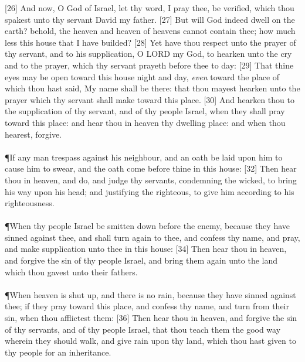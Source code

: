 [26] \textcolor[cmyk]{0.99998,1,0,0}{And now, O God of Israel, let thy word, I pray thee, be verified, which thou spakest unto thy servant David my father.}
[27] \textcolor[cmyk]{0.99998,1,0,0}{But will God indeed dwell on the earth? behold, the heaven and heaven of heavens cannot contain thee; how much less this house that I have builded?}
[28] \textcolor[cmyk]{0.99998,1,0,0}{Yet have thou respect unto the prayer of thy servant, and to his supplication, O LORD my God, to hearken unto the cry and to the prayer, which thy servant prayeth before thee to day:}
[29] \textcolor[cmyk]{0.99998,1,0,0}{That thine eyes may be open toward this house night and day, \emph{even} toward the place of which thou hast said, My name shall be there: that thou mayest hearken unto the prayer which thy servant shall make toward this place.}
[30] \textcolor[cmyk]{0.99998,1,0,0}{And hearken thou to the supplication of thy servant, and of thy people Israel, when they shall pray toward this place: and hear thou in heaven thy dwelling place: and when thou hearest, forgive.}\\
\\
\P \textcolor[cmyk]{0.99998,1,0,0}{If any man trespass against his neighbour, and an oath be laid upon him to cause him to swear, and the oath come before thine  in this house:}
[32] \textcolor[cmyk]{0.99998,1,0,0}{Then hear thou in heaven, and do, and judge thy servants, condemning the wicked, to bring his way upon his head; and justifying the righteous, to give him according to his righteousness.}\\
\\
\P \textcolor[cmyk]{0.99998,1,0,0}{When thy people Israel be smitten down before the enemy, because they have sinned against thee, and shall turn again to thee, and confess thy name, and pray, and make supplication unto thee in this house:}
[34] \textcolor[cmyk]{0.99998,1,0,0}{Then hear thou in heaven, and forgive the sin of thy people Israel, and bring them again unto the land which thou gavest unto their fathers.}\\
\\
\P \textcolor[cmyk]{0.99998,1,0,0}{When heaven is shut up, and there is no rain, because they have sinned against thee; if they pray toward this place, and confess thy name, and turn from their sin, when thou afflictest them:}
[36] \textcolor[cmyk]{0.99998,1,0,0}{Then hear thou in heaven, and forgive the sin of thy servants, and of thy people Israel, that thou teach them the good way wherein they should walk, and give rain upon thy land, which thou hast given to thy people for an inheritance.}\\
